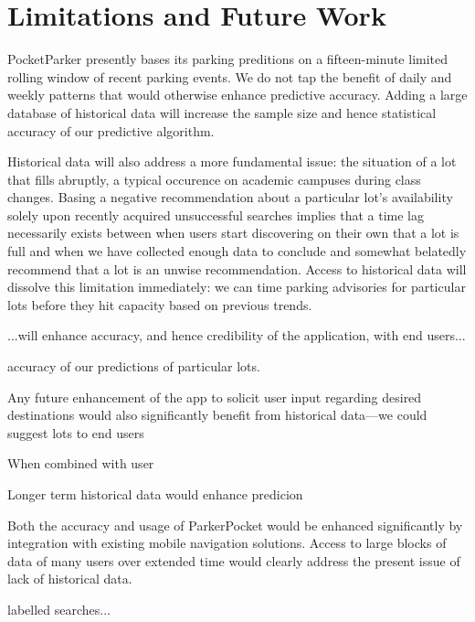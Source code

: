 \section{Limitations and Future Work}
\label{sec-future}



PocketParker presently bases its parking preditions on a fifteen-minute 
limited rolling window of recent parking events. We do not tap the benefit
of daily and weekly patterns that would otherwise enhance predictive accuracy.
Adding a large database of historical data will increase the sample size and
hence statistical accuracy of our predictive algorithm.

Historical data will also address a more fundamental issue:  the situation
of a lot that fills abruptly, a typical occurence on academic campuses during
class changes. Basing a negative recommendation about a particular lot's
availability solely upon recently acquired unsuccessful searches implies that
a time lag necessarily exists between when users start discovering on their
own that a lot is full and when we have collected enough data to conclude and
somewhat belatedly recommend that a lot is an unwise recommendation. Access
to historical data will dissolve this limitation immediately:  we can time
parking advisories for particular lots before they hit capacity based on
previous trends.


...will enhance accuracy, and hence credibility of the application, with end users...

accuracy of our predictions of particular lots.

Any future enhancement of the app to solicit user input regarding desired
destinations would also significantly benefit from historical data---we
could suggest lots to end users 

When combined with user

Longer term historical data
would enhance predicion




Both the accuracy and usage of ParkerPocket would be enhanced significantly
by integration with existing mobile navigation solutions.  Access to large blocks of data of many users over extended time
would clearly address the present issue of lack of historical data.


labelled searches...







